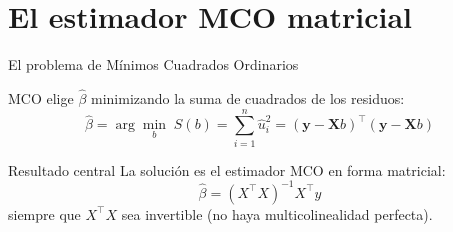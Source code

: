 \documentclass{beamer}
\begin{document}
\section{El estimador MCO matricial}

\begin{frame}{El problema de Mínimos Cuadrados Ordinarios}

MCO elige $\hat{\beta}$ minimizando la suma de cuadrados de los residuos:
\[
\hat{\beta} = \arg\min_{b} \; S(b) = \sum_{i=1}^{n} \hat{u}_i^2 = (\mathbf{y}-\mathbf{X}b)^{\top}(\mathbf{y}-\mathbf{X}b)
\]

\pause

\begin{block}{Resultado central}
La solución es el estimador MCO en forma matricial:
\[
\boxed{\;\hat{\beta} = (X^{\top}X)^{-1}X^{\top}y\;}
\]
siempre que $X^{\top}X$ sea invertible (no haya multicolinealidad perfecta).
\end{block}

\end{frame}
\end{document}
